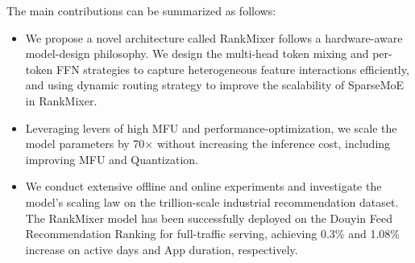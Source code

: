 The main contributions can be summarized as follows:
\begin{itemize}[leftmargin=6pt]
    \item We propose a novel architecture called RankMixer follows a hardware-aware model-design philosophy. We design the multi-head token mixing and per-token FFN strategies to capture heterogeneous feature interactions efficiently, and using dynamic routing strategy to improve the scalability of SparseMoE in RankMixer.
    \item Leveraging levers of high MFU and performance-optimization, we scale the model parameters by 70× without increasing the inference cost, including improving MFU and Quantization.
    \item We conduct extensive offline and online experiments and investigate the model's scaling law on the trillion-scale industrial recommendation dataset. The RankMixer model has been successfully deployed on the Douyin Feed Recommendation Ranking for full-traffic serving, achieving 0.3\% and  1.08\% increase on active days and App duration, respectively.
\end{itemize}

